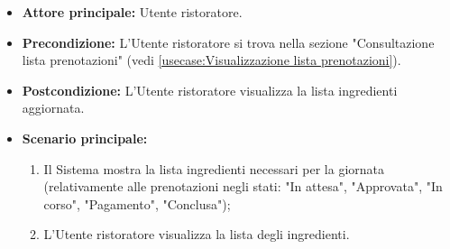 \label{usecase:Consultazione lista ingredienti}
\begin{itemize}

	\item \textbf{Attore principale:} Utente ristoratore.

	\item \textbf{Precondizione:} L'Utente ristoratore si trova nella sezione 
		"Consultazione lista prenotazioni" (vedi 
		\autoref{usecase:Visualizzazione lista prenotazioni}).

	\item \textbf{Postcondizione:} L'Utente ristoratore visualizza la lista 
		ingredienti aggiornata.

	\item \textbf{Scenario principale:}
	      \begin{enumerate}
		      \item Il Sistema mostra la lista ingredienti necessari per la 
				  giornata (relativamente alle prenotazioni negli stati: "In
				  attesa", "Approvata", "In corso", "Pagamento", "Conclusa");
		      \item L'Utente ristoratore visualizza la lista degli ingredienti.
	      \end{enumerate}

\end{itemize}


